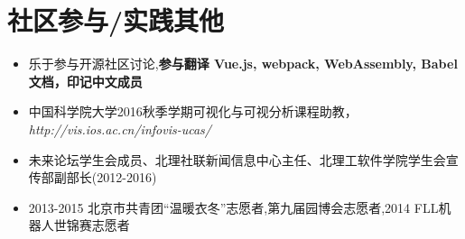 \documentclass{resume}
\begin{document}
\section{社区参与/实践其他}
\begin{itemize}[parsep=0.2ex]
  \item 乐于参与开源社区讨论,\textbf{参与翻译 Vue.js, webpack, WebAssembly, Babel 文档，印记中文成员}
  \item 中国科学院大学2016秋季学期可视化与可视分析课程助教，\textit{http://vis.ios.ac.cn/infovis-ucas/}
  \item 未来论坛学生会成员、北理社联新闻信息中心主任、北理工软件学院学生会宣传部副部长(2012-2016)
  \item 2013-2015 北京市共青团“温暖衣冬”志愿者,第九届园博会志愿者,2014 FLL机器人世锦赛志愿者
\end{itemize}

%
%
\end{document}
